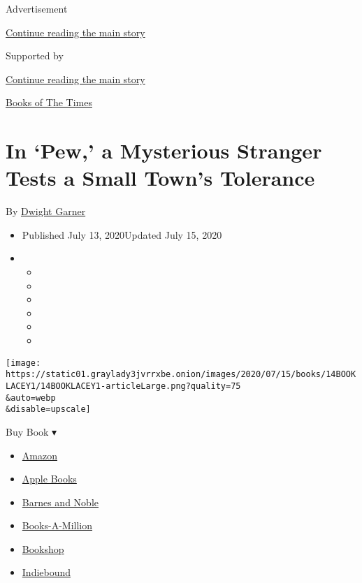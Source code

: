 Advertisement

\protect\hyperlink{after-top}{Continue reading the main story}

Supported by

\protect\hyperlink{after-sponsor}{Continue reading the main story}

\href{/column/books-of-the-times}{Books of The Times}

\hypertarget{in-pew-a-mysterious-stranger-tests-a-small-towns-tolerance}{%
\section{In `Pew,' a Mysterious Stranger Tests a Small Town's
Tolerance}\label{in-pew-a-mysterious-stranger-tests-a-small-towns-tolerance}}

By \href{https://www.nytimes3xbfgragh.onion/by/dwight-garner}{Dwight
Garner}

\begin{itemize}
\item
  Published July 13, 2020Updated July 15, 2020
\item
  \begin{itemize}
  \item
  \item
  \item
  \item
  \item
  \item
  \end{itemize}
\end{itemize}

\texttt{[image: https://static01.graylady3jvrrxbe.onion/images/2020/07/15/books/14BOOKLACEY1/14BOOKLACEY1-articleLarge.png?quality=75\\\&auto=webp\\\&disable=upscale]}

Buy Book ▾

\begin{itemize}
\tightlist
\item
  \href{https://www.amazon.com/gp/search?index=books\&tag=NYTBSREV-20\&field-keywords=Pew+Catherine+Lacey}{Amazon}
\item
  \href{https://du-gae-books-dot-nyt-du-prd.appspot.com/buy?title=Pew\&author=Catherine+Lacey}{Apple
  Books}
\item
  \href{https://www.anrdoezrs.net/click-7990613-11819508?url=https\%3A\%2F\%2Fwww.barnesandnoble.com\%2Fw\%2F\%3Fean\%3D9780374230920}{Barnes
  and Noble}
\item
  \href{https://www.anrdoezrs.net/click-7990613-35140?url=https\%3A\%2F\%2Fwww.booksamillion.com\%2Fp\%2FPew\%2FCatherine\%2BLacey\%2F9780374230920}{Books-A-Million}
\item
  \href{https://bookshop.org/a/3546/9780374230920}{Bookshop}
\item
  \href{https://www.indiebound.org/book/9780374230920?aff=NYT}{Indiebound}
\end{itemize}


